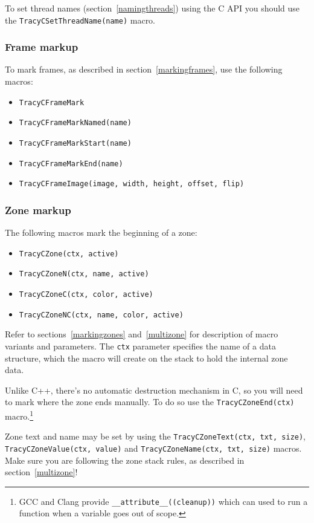 \documentclass[hidelinks,titlepage,a4paper,twoside]{article}
\begin{document}
To set thread names (section~\ref{namingthreads}) using the C API you should use the \texttt{TracyCSetThreadName(name)} macro.

\subsubsection{Frame markup}

To mark frames, as described in section~\ref{markingframes}, use the following macros:

\begin{itemize}
\item \texttt{TracyCFrameMark}
\item \texttt{TracyCFrameMarkNamed(name)}
\item \texttt{TracyCFrameMarkStart(name)}
\item \texttt{TracyCFrameMarkEnd(name)}
\item \texttt{TracyCFrameImage(image, width, height, offset, flip)}
\end{itemize}

\subsubsection{Zone markup}
\label{czonemarkup}

The following macros mark the beginning of a zone:

\begin{itemize}
\item \texttt{TracyCZone(ctx, active)}
\item \texttt{TracyCZoneN(ctx, name, active)}
\item \texttt{TracyCZoneC(ctx, color, active)}
\item \texttt{TracyCZoneNC(ctx, name, color, active)}
\end{itemize}

Refer to sections~\ref{markingzones} and~\ref{multizone} for description of macro variants and parameters. The \texttt{ctx} parameter specifies the name of a data structure, which the macro will create on the stack to hold the internal zone data.

Unlike C++, there's no automatic destruction mechanism in C, so you will need to mark where the zone ends manually. To do so use the \texttt{TracyCZoneEnd(ctx)} macro.\footnote{GCC and Clang provide \texttt{\_\_attribute\_\_((cleanup))} which can used to run a function when a variable goes out of scope.}

Zone text and name may be set by using the \texttt{TracyCZoneText(ctx, txt, size)}, \texttt{TracyCZoneValue(ctx, value)} and \texttt{TracyCZoneName(ctx, txt, size)} macros. Make sure you are following the zone stack rules, as described in section~\ref{multizone}!
\end{document}
